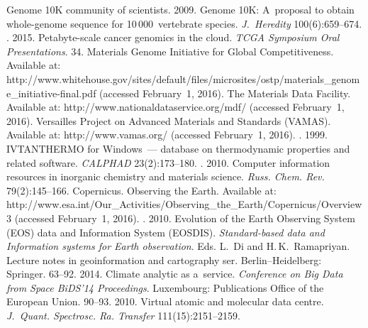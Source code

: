 \begin{multicols}{2}
{{\begin{thebibliography}{99}
Genome 10K community of scientists. 2009. Genome 10K: A~proposal to obtain whole-genome sequence for 
10\,000~vertebrate species. \textit{J.~Heredity} 100(6):659--674.
. 2015. Petabyte-scale cancer genomics in the 
cloud. \textit{TCGA Symposium Oral Presentations}. 34.
Materials Genome Initiative for Global Competitiveness. Available at: {\sf 
http://www.whitehouse.gov/sites/\linebreak default/files/microsites/ostp/materials\_genome\_initiati\linebreak ve-final.pdf} (accessed 
February~1, 2016).
The Materials Data Facility. Available at: {\sf http://www.\linebreak nationaldataservice.org/mdf/} (accessed February~1, 
2016).
Versailles Project on Advanced Materials and Standards (VAMAS). Available at: {\sf http://www.vamas.org/} 
(accessed February~1, 2016).
. 1999. IVTANTHERMO for Windows~--- database on 
thermodynamic properties and related software. \textit{CALPHAD} 23(2):173--180.
. 2010. Computer information resources in inorganic 
chemistry and materials science. \textit{Russ. Chem. Rev.} 79(2):145--166.
Copernicus. Observing the Earth. Available at: {\sf 
http://\linebreak www.esa.int/Our\_Activities/Observing\_the\_Earth/\linebreak  Copernicus/Overview3} (accessed February~1, 2016).
. 2010. Evolution of the 
Earth Observing System (EOS) data and Information System (\mbox{EOSDIS}). \textit{Standard-based data and Information 
systems for Earth observation}. Eds. L.~Di and H.\,K.~Ramapriyan. Lecture notes in geoinformation and 
cartography ser. Berlin--Heidelberg: Springer. 63--92.
 2014. Climate analytic as a~service. 
\textit{Conference on Big Data from Space BiDS'14 Proceedings}. 
Luxembourg: Publications Office of the 
European Union. 90--93.
 2010. Virtual atomic and molecular data centre. 
\textit{J.~Quant. Spectrosc. Ra. Transfer} 111(15):2151--2159.

\end{thebibliography}}}
\end{multicols}
